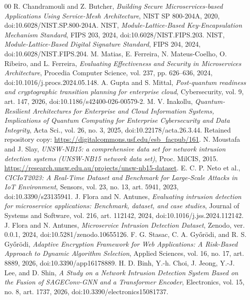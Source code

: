 \documentclass[conference,a4paper]{IEEEtran}
\begin{document}
\balance
\begin{thebibliography}{00}
 R. Chandramouli and Z. Butcher, \emph{Building Secure Microservices-based Applications Using Service-Mesh Architecture}, NIST SP 800-204A, 2020, doi:10.6028/NIST.SP.800-204A.
 NIST, \emph{Module-Lattice-Based Key-Encapsulation Mechanism Standard}, FIPS 203, 2024, doi:10.6028/NIST.FIPS.203.
 NIST, \emph{Module-Lattice-Based Digital Signature Standard}, FIPS 204, 2024, doi:10.6028/NIST.FIPS.204.
 M. Matias, E. Ferreira, N. Mateus-Coelho, O. Ribeiro, and L. Ferreira, \emph{Evaluating Effectiveness and Security in Microservices Architecture}, Procedia Computer Science, vol. 237, pp. 626--636, 2024, doi:10.1016/j.procs.2024.05.148.
 A. Gupta and S. Mittal, \emph{Post-quantum readiness and cryptographic transition planning for enterprise cloud}, Cybersecurity, vol. 9, art. 147, 2026, doi:10.1186/s42400-026-00579-2.
 M. V. Inakollu, \emph{Quantum-Resilient Architectures for Enterprise and Cloud Information Systems, Implications of Quantum Computing for Enterprise Cybersecurity and Data Integrity}, Acta Sci., vol. 26, no. 3, 2025, doi:10.22178/acta.26.3.44. Retained repository copy: \url{https://digitalcommons.usf.edu/esb_facpub/161}.
 N. Moustafa and J. Slay, \emph{UNSW-NB15: a comprehensive data set for network intrusion detection systems (UNSW-NB15 network data set)}, Proc. MilCIS, 2015. \url{https://research.unsw.edu.au/projects/unsw-nb15-dataset}.
 E. C. P. Neto et al., \emph{CICIoT2023: A Real-Time Dataset and Benchmark for Large-Scale Attacks in IoT Environment}, Sensors, vol. 23, no. 13, art. 5941, 2023, doi:10.3390/s23135941.
 J. Flora and N. Antunes, \emph{Evaluating intrusion detection for microservice applications: Benchmark, dataset, and case studies}, Journal of Systems and Software, vol. 216, art. 112142, 2024, doi:10.1016/j.jss.2024.112142.
 J. Flora and N. Antunes, \emph{Microservice Intrusion Detection Dataset}, Zenodo, ver. 0.0.1, 2024, doi:10.5281/zenodo.10655126.
 F. G. Stasac, C. A. Gy{\H{o}}r{\"o}di, and R. S. Gy{\H{o}}r{\"o}di, \emph{Adaptive Encryption Framework for Web Applications: A Risk-Based Approach to Dynamic Algorithm Selection}, Applied Sciences, vol. 16, no. 17, art. 8889, 2026, doi:10.3390/app16178889.
 H. D. Binh, Y.-h. Choi, J. Jeong, Y.-J. Lee, and D. Shin, \emph{A Study on a Network Intrusion Detection System Based on the Fusion of SAGEConv-GNN and a Transformer Encoder}, Electronics, vol. 15, no. 8, art. 1737, 2026, doi:10.3390/electronics15081737.

\end{thebibliography}
\end{document}
